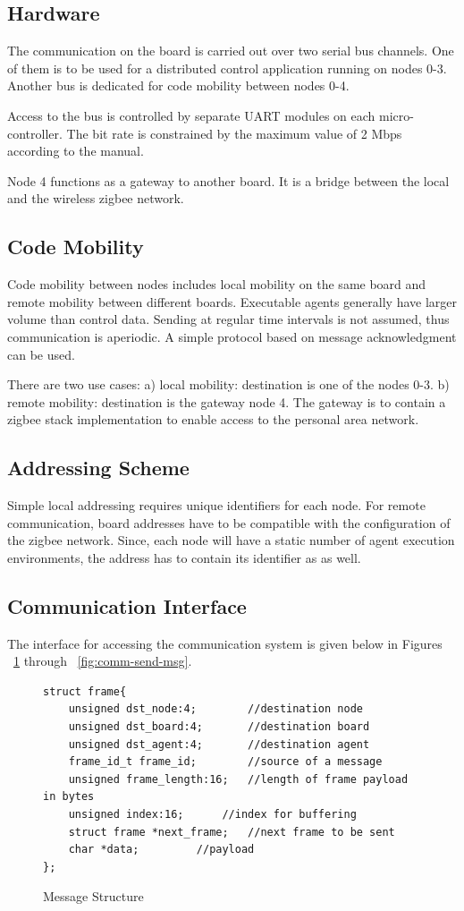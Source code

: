 \documentclass{scrreprt}
\begin{document}
\subsection{Hardware}

The communication on the board is carried out
over two serial bus channels. One of them is to be used for a distributed control
application running on nodes 0-3. Another bus is dedicated for code mobility between nodes 0-4.

Access to the bus is controlled by separate UART modules on each
micro-controller. The bit rate is constrained by the maximum value of 2 Mbps according to the manual.  

Node 4 functions as a gateway to another board. It is a bridge between the local
and the wireless zigbee network.


\subsection{Code Mobility}
Code mobility between nodes includes local mobility on the same board and
remote mobility between different boards. Executable agents generally have
larger volume than control data. Sending at regular time intervals is not assumed,
thus communication is aperiodic.
A simple protocol based on message acknowledgment can be used. 

There are two use cases: a) local mobility: destination is one of the nodes 0-3.
b) remote mobility: destination is the gateway node 4. 
The gateway is to contain a zigbee stack implementation to enable 
access to the personal area network.

\subsection{Addressing Scheme}
Simple local addressing requires unique identifiers for
each node. For remote communication, board addresses have to be compatible
with the configuration of the zigbee network. Since, each node will have a static 
number of agent execution environments, the address has to contain its
identifier as as well.  

\subsection{Communication Interface}
The interface for accessing the communication system is given below
in Figures ~\ref{fig:msg-struct} through ~\ref{fig:comm-send-msg}. %
\begin{figure}[!htb]
\lstset{language=C, breaklines=true}
\begin{lstlisting}[frame=single]
struct frame{
	unsigned dst_node:4;		//destination node
	unsigned dst_board:4;		//destination board
	unsigned dst_agent:4;		//destination agent
	frame_id_t frame_id;		//source of a message
	unsigned frame_length:16;	//length of frame payload in bytes
	unsigned index:16;		//index for buffering
	struct frame *next_frame;	//next frame to be sent
	char *data;			//payload
};
\end{lstlisting}
\caption{Message Structure}
\label{fig:msg-struct}
\end{figure}
\end{document}
